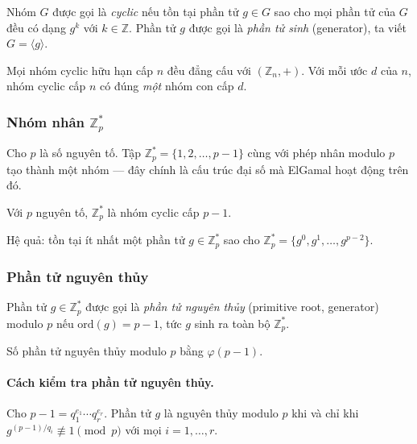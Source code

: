\documentclass[../DoAn.tex]{subfiles}
\begin{document}
\begin{definition}
Nhóm $G$ được gọi là \emph{cyclic} nếu tồn tại phần tử $g \in G$ sao cho mọi phần tử của $G$ đều có dạng $g^k$ với $k \in \mathbb{Z}$. Phần tử $g$ được gọi là \emph{phần tử sinh} (generator), ta viết $G = \langle g \rangle$.
\end{definition}

\begin{theorem}
Mọi nhóm cyclic hữu hạn cấp $n$ đều đẳng cấu với $(\mathbb{Z}_n, +)$. Với mỗi ước $d$ của $n$, nhóm cyclic cấp $n$ có đúng \emph{một} nhóm con cấp $d$.
\end{theorem}

\subsubsection{Nhóm nhân \texorpdfstring{$\mathbb{Z}_p^*$}{Zp*}}

Cho $p$ là số nguyên tố. Tập $\mathbb{Z}_p^* = \{1, 2, \ldots, p-1\}$ cùng với phép nhân modulo $p$ tạo thành một nhóm --- đây chính là cấu trúc đại số mà ElGamal hoạt động trên đó.

\begin{theorem}[Gauss]
\label{thm:zp-cyclic}
Với $p$ nguyên tố, $\mathbb{Z}_p^*$ là nhóm cyclic cấp $p - 1$.
\end{theorem}

Hệ quả: tồn tại ít nhất một phần tử $g \in \mathbb{Z}_p^*$ sao cho $\mathbb{Z}_p^* = \{g^0, g^1, \ldots, g^{p-2}\}$.

\subsubsection{Phần tử nguyên thủy}

\begin{definition}
Phần tử $g \in \mathbb{Z}_p^*$ được gọi là \emph{phần tử nguyên thủy} (primitive root, generator) modulo $p$ nếu $\mathrm{ord}(g) = p - 1$, tức $g$ sinh ra toàn bộ $\mathbb{Z}_p^*$.
\end{definition}

\begin{theorem}
Số phần tử nguyên thủy modulo $p$ bằng $\varphi(p-1)$.
\end{theorem}

\paragraph{Cách kiểm tra phần tử nguyên thủy.}
Cho $p - 1 = q_1^{e_1} \cdots q_r^{e_r}$. Phần tử $g$ là nguyên thủy modulo $p$ khi và chỉ khi $g^{(p-1)/q_i} \not\equiv 1 \pmod{p}$ với mọi $i = 1, \ldots, r$.
\end{document}
